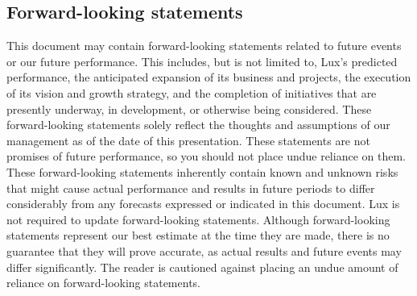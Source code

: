 \documentclass[11pt]{article}
\begin{document}
\subsection{Forward-looking statements}

This document may contain forward-looking statements related to future events or our future performance. This includes, but is not limited to, Lux's predicted performance, the anticipated expansion of its business and projects, the execution of its vision and growth strategy, and the completion of initiatives that are presently underway, in development, or otherwise being considered. These forward-looking statements solely reflect the thoughts and assumptions of our management as of the date of this presentation. These statements are not promises of future performance, so you should not place undue reliance on them. These forward-looking statements inherently contain known and unknown risks that might cause actual performance and results in future periods to differ considerably from any forecasts expressed or indicated in this document. Lux is not required to update forward-looking statements. Although forward-looking statements represent our best estimate at the time they are made, there is no guarantee that they will prove accurate, as actual results and future events may differ significantly. The reader is cautioned against placing an undue amount of reliance on forward-looking statements.
\end{document}
